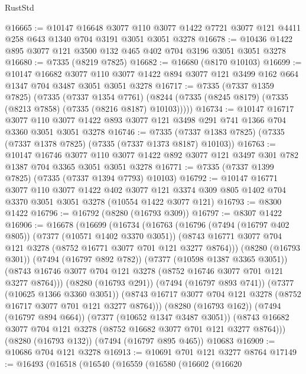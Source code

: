 \begin{lexlean}{RustStd}
\begin{coremodule}
@16665 := @10147
    @16648
    @3077
    @110
    @3077
    @1422
    @7721
    @3077
    @121
    @4411
    @258
    @643
    @1340
    @704
    @3191
    @3051
    @3051
    @3278
@16678 := @10436 @1422 @895 @3077 @121 @3500 @132 @465 @402 @704 @3196 @3051 @3051 @3278
@16680 := @7335 (@8219 @7825)
@16682 := @16680 (@8170 @10103)
@16699 := @10147
    @16682
    @3077
    @110
    @3077
    @1422
    @894
    @3077
    @121
    @3499
    @162
    @664
    @1347
    @704
    @3487
    @3051
    @3051
    @3278
@16717 := @7335
    (@7337 @1359 @7825)
    (@7335
      (@7337 @1354 @7761)
      (@8244 (@7335 (@8245 @8179) (@7335 (@8213 @7858) (@7335 (@8216 @8187) @10103)))))
@16734 := @10147
    @16717
    @3077
    @110
    @3077
    @1422
    @893
    @3077
    @121
    @3498
    @291
    @741
    @1366
    @704
    @3360
    @3051
    @3051
    @3278
@16746 := @7335 (@7337 @1383 @7825) (@7335 (@7337 @1378 @7825) (@7335 (@7337 @1373 @8187) @10103))
@16763 := @10147
    @16746
    @3077
    @110
    @3077
    @1422
    @892
    @3077
    @121
    @3497
    @301
    @782
    @1387
    @704
    @3365
    @3051
    @3051
    @3278
@16771 := @7335 (@7337 @1399 @7825) (@7335 (@7337 @1394 @7793) @10103)
@16792 := @10147
    @16771
    @3077
    @110
    @3077
    @1422
    @402
    @3077
    @121
    @3374
    @309
    @805
    @1402
    @704
    @3370
    @3051
    @3051
    @3278
    (@10554 @1422 @3077 @121)
@16793 := @8300 @1422
@16796 := @16792 (@8280 (@16793 @309))
@16797 := @8307 @1422
@16906 := @16678
    (@16699
      (@16734
        (@16763
          (@16796
            (@7494 (@16797 @402 @805))
            (@7377 (@10571 @1402 @3370 @3051))
            (@8743 @16771 @3077 @704 @121 @3278 (@8752 @16771 @3077 @701 @121 @3277 @8764)))
          (@8280 (@16793 @301))
          (@7494 (@16797 @892 @782))
          (@7377 (@10598 @1387 @3365 @3051))
          (@8743 @16746 @3077 @704 @121 @3278 (@8752 @16746 @3077 @701 @121 @3277 @8764)))
        (@8280 (@16793 @291))
        (@7494 (@16797 @893 @741))
        (@7377 (@10625 @1366 @3360 @3051))
        (@8743 @16717 @3077 @704 @121 @3278 (@8752 @16717 @3077 @701 @121 @3277 @8764)))
      (@8280 (@16793 @162))
      (@7494 (@16797 @894 @664))
      (@7377 (@10652 @1347 @3487 @3051))
      (@8743 @16682 @3077 @704 @121 @3278 (@8752 @16682 @3077 @701 @121 @3277 @8764)))
    (@8280 (@16793 @132))
    (@7494 (@16797 @895 @465))
    @10683
@16909 := @10686 @704 @121 @3278
@16913 := @10691 @701 @121 @3277 @8764
@17149 := @16493
    (@16518
      (@16540
        (@16559
          (@16580
            (@16602
              (@16620

\end{coremodule}
\end{lexlean}
